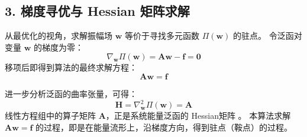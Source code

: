 \documentclass[a4paper,12pt]{ctexart}
\begin{document}
\subsection*{3. 梯度寻优与 Hessian 矩阵求解}
从最优化的视角，求解振幅场 $\mathbf{w}$ 等价于寻找多元函数 $\Pi(\mathbf{w})$ 的驻点。
令泛函对变量 $\mathbf{w}$ 的梯度为零：
\begin{equation}
    \nabla_{\mathbf{w}} \Pi(\mathbf{w}) = \mathbf{A} \mathbf{w} - \mathbf{f} = \mathbf{0}
\end{equation}
移项后即得到算法的最终求解方程：
\begin{equation}
    \mathbf{A} \mathbf{w} = \mathbf{f}
\end{equation}

进一步分析泛函的曲率张量，可得：
\begin{equation}
    \mathbf{H} = \nabla_{\mathbf{w}}^2 \Pi(\mathbf{w}) = \mathbf{A}
\end{equation}
线性方程组中的算子矩阵 $\mathbf{A}$，正是系统能量泛函的 Hessian矩阵 。
本算法求解 $\mathbf{A}\mathbf{w}=\mathbf{f}$ 的过程，即是在能量流形上，沿梯度方向，得到驻点（鞍点）的过程。
\end{document}

